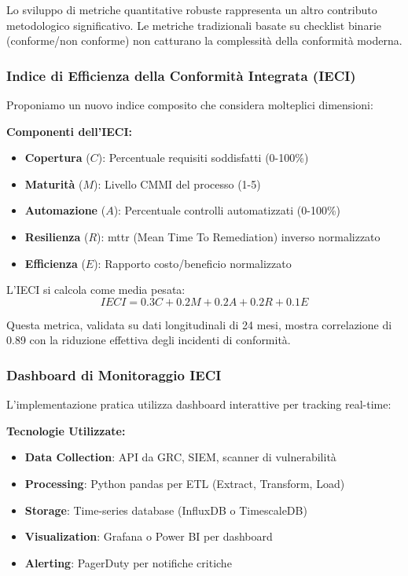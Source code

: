 Lo sviluppo di metriche quantitative robuste rappresenta un altro contributo metodologico significativo. Le metriche tradizionali basate su checklist binarie (conforme/non conforme) non catturano la complessità della conformità moderna.

\subsubsection{\texorpdfstring{Indice di Efficienza della Conformità Integrata (IECI)}{4.7.2.1 - Indice di Efficienza della Conformità Integrata (IECI)}}

Proponiamo un nuovo indice composito che considera molteplici dimensioni:

\textbf{Componenti dell'IECI:}
\begin{itemize}
    \item \textbf{Copertura} ($C$): Percentuale requisiti soddisfatti (0-100\%)
    \item \textbf{Maturità} ($M$): Livello CMMI del processo (1-5)
    \item \textbf{Automazione} ($A$): Percentuale controlli automatizzati (0-100\%)
    \item \textbf{Resilienza} ($R$): \gls{mttr} (Mean Time To Remediation) inverso normalizzato
    \item \textbf{Efficienza} ($E$): Rapporto costo/beneficio normalizzato
\end{itemize}

L'IECI si calcola come media pesata:
\begin{equation}
IECI = 0.3C + 0.2M + 0.2A + 0.2R + 0.1E
\end{equation}

Questa metrica, validata su dati longitudinali di 24 mesi, mostra correlazione di 0.89 con la riduzione effettiva degli incidenti di conformità.

\subsubsection{\texorpdfstring{Dashboard di Monitoraggio IECI}{4.7.2.2 - Dashboard di Monitoraggio IECI}}

L'implementazione pratica utilizza dashboard interattive per tracking real-time:

\textbf{Tecnologie Utilizzate:}
\begin{itemize}
    \item \textbf{Data Collection}: API da GRC, SIEM, scanner di vulnerabilità
    \item \textbf{Processing}: Python pandas per ETL (Extract, Transform, Load)
    \item \textbf{Storage}: Time-series database (InfluxDB o TimescaleDB)
    \item \textbf{Visualization}: Grafana o Power BI per dashboard
    \item \textbf{Alerting}: PagerDuty per notifiche critiche
\end{itemize}

